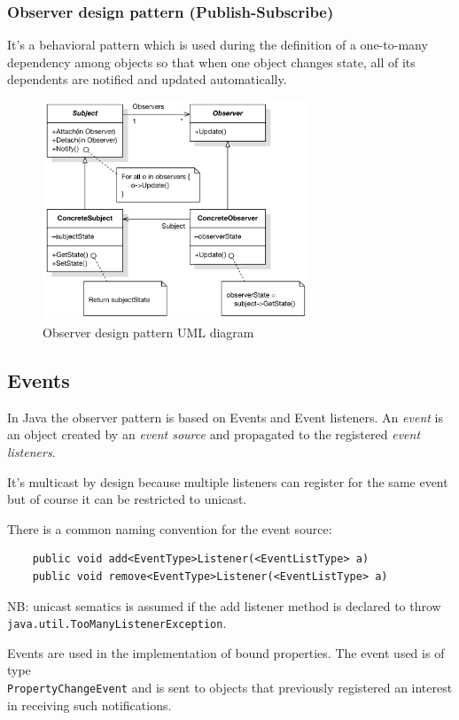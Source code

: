 \subsubsection{Observer design pattern (Publish-Subscribe)}
It's a behavioral pattern which is used during the definition of a one-to-many dependency among objects so that when one object changes state, all of its dependents are notified and updated automatically.

\begin{figure}[H]
    \centering
    \includegraphics[width=300px]{images/3_Software_Components/Observer_pattern_UML.png}
    \caption{Observer design pattern UML diagram}
\end{figure}

\subsection{Events}
In Java the observer pattern is based on Events and Event listeners.
An \emph{event} is an object created by an \emph{event source} and propagated to the registered \emph{event listeners}.

It's multicast by design because multiple listeners can register for the same event but of course it can be restricted to unicast.

There is a common naming convention for the event source:
\begin{verbatim}
    public void add<EventType>Listener(<EventListType> a)
    public void remove<EventType>Listener(<EventListType> a) 
\end{verbatim}

NB: unicast sematics is assumed if the add listener method is declared to throw \\
\verb|java.util.TooManyListenerException|.

Events are used in the implementation of bound properties.
The event used is of type \\
\verb|PropertyChangeEvent| and is sent to objects that previously registered an interest in receiving such notifications.

